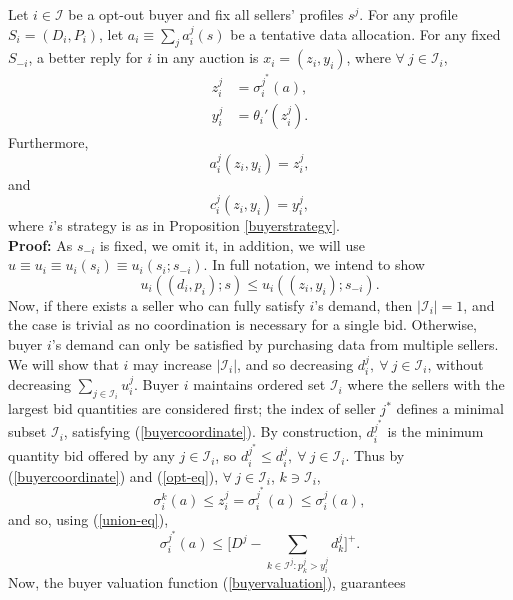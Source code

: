 \documentclass[12pt]{article}
\theoremstyle{definition}
\newcommand{\mcI}{\mathcal{I}}
\newcommand{\g}{\sigma}
\begin{document}
\begin{multicols}{2}
{
\label{coordinationlemma} 
Let $i\in\mcI$ be a opt-out buyer and fix all sellers' profiles $s^j$.
For any profile $S_i = (D_i, P_i)$, let $a_i \equiv \sum_j a_i^j(s)$ be a
tentative data
allocation. For any fixed $S_{-i}$, a better reply for $i$ in any auction is $x_i =
(z_i,y_i)$, where $\forall \ j \in \mcI_i$,
\begin{align*}
    z_i^j &= \g_i^{j^*}(a), \\
    y_i^j &= \theta_i'(z_i^j).
\end{align*}
Furthermore,
\begin{equation}\label{allocationcoordination}
    a_i^j(z_i,y_i) = z_i^{j},
\end{equation}
and
\begin{equation}\label{costcoordination}
    c_i^j(z_i,y_i) = y_i^{j},
\end{equation}
where $i$'s strategy is as in Proposition \ref{buyerstrategy}.
}\\
\textbf{Proof:}
As $s_{-i}$ is fixed, we omit it, in addition, we will use $u\equiv u_i \equiv u_i(s_i) \equiv
u_i(s_i;s_{-i})$. In full notation, we intend to show
$$
    u_i((d_i,p_i);s) \le u_i((z_i,y_i);s_{-i}).
$$
Now, if there exists a seller who can fully satisfy $i$'s demand,
then $\vert\mcI_i\vert = 1$, and the case is trivial as no
coordination is necessary for a single bid. %
Otherwise, buyer $i$'s demand can only be satisfied by purchasing data from
multiple sellers.
We will show that $i$ may increase $\vert\mcI_i\vert$, and so decreasing
$d_i^j, \ \forall \ j\in\mcI_i$, without decreasing $\sum_{j\in\mcI_i}u_i^j$.
Buyer $i$ maintains ordered set $\mcI_i$ where the sellers with the
largest bid quantities are considered first; the index of seller $j^*$ defines
a minimal subset $\mcI_i$, satisfying (\ref{buyercoordinate}). By construction, 
$d_i^{j^*}$ is the minimum quantity bid offered by any $j\in \mcI_i$,
so $d_i^{j^*} \le d_i^j, \ \forall \ j \in \mcI_i$. 
Thus by (\ref{buyercoordinate}) and (\ref{opt-eq}), $\forall \ j\in \mcI_i$,
$k\ni\mcI_i$,
$$
    \g_i^k(a) \le z_i^j = \g_i^{j^*}(a) \le \g_i^{j}(a),
$$
and so, using (\ref{union-eq}), 
\begin{equation}\label{minimaleq}
    \g_i^{j^*}(a)  \le \bigg\lbrack D^{j} - \sum_{k\in \mcI^j : p_k^{j}> y_{i}^{j}} d_k^{j}\bigg\rbrack^+.
\end{equation}
Now, the buyer valuation function (\ref{buyervaluation}), guarantees

\end{multicols}
\end{document}
